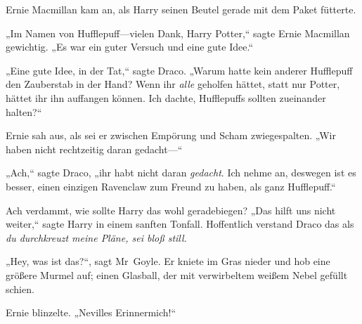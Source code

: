 Ernie Macmillan kam an, als Harry seinen Beutel gerade mit dem Paket fütterte.

„Im Namen von Hufflepuff—vielen Dank, Harry Potter,“ sagte Ernie Macmillan gewichtig. „Es war ein guter Versuch und eine gute Idee.“

„Eine gute Idee, in der Tat,“ sagte Draco. „Warum hatte kein anderer Hufflepuff den Zauberstab in der Hand? Wenn ihr \emph{alle} geholfen hättet, statt nur Potter, hättet ihr ihn auffangen können. Ich dachte, Hufflepuffs sollten zueinander halten?“

Ernie sah aus, als sei er zwischen Empörung und Scham zwiegespalten. „Wir haben nicht rechtzeitig daran gedacht—“

„Ach,“ sagte Draco, „ihr habt nicht daran \emph{gedacht}. Ich nehme an, deswegen ist es besser, einen einzigen Ravenclaw zum Freund zu haben, als ganz Hufflepuff.“

Ach verdammt, wie sollte Harry das wohl geradebiegen? „Das hilft uns nicht weiter,“ sagte Harry in einem sanften Tonfall. Hoffentlich verstand Draco das als \emph{du durchkreuzt meine Pläne, sei bloß still.}

„Hey, was ist das?“, sagt Mr~Goyle. Er kniete im Gras nieder und hob eine größere Murmel auf; einen Glasball, der mit verwirbeltem weißem Nebel gefüllt schien.

Ernie blinzelte. „Nevilles Erinnermich!“

